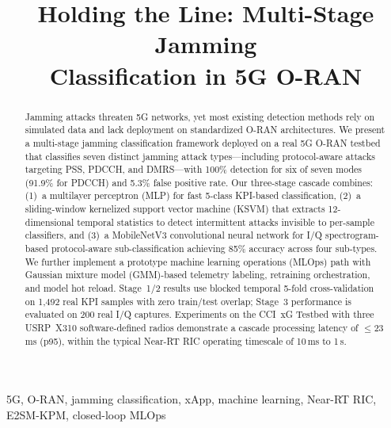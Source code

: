 \documentclass[conference]{IEEEtran}
\begin{document}
\title{Holding the Line: Multi-Stage Jamming\\Classification in 5G O-RAN}

\author{
}

\maketitle

\begin{abstract}
Jamming attacks threaten 5G networks, yet most existing detection methods rely on simulated data and lack deployment on standardized O-RAN architectures. We present a multi-stage jamming classification framework deployed on a real 5G O-RAN testbed that classifies seven distinct jamming attack types---including protocol-aware attacks targeting PSS, PDCCH, and DMRS---with 100\% detection for six of seven modes (91.9\% for PDCCH) and 5.3\% false positive rate. Our three-stage cascade combines: (1)~a multilayer perceptron (MLP) for fast 5-class KPI-based classification, (2)~a sliding-window kernelized support vector machine (KSVM) that extracts 12-dimensional temporal statistics to detect intermittent attacks invisible to per-sample classifiers, and (3)~a MobileNetV3 convolutional neural network for I/Q spectrogram-based protocol-aware sub-classification achieving 85\% accuracy across four sub-types. We further implement a prototype machine learning operations (MLOps) path with Gaussian mixture model (GMM)-based telemetry labeling, retraining orchestration, and model hot reload. Stage~1/2 results use blocked temporal 5-fold cross-validation on 1,492 real KPI samples with zero train/test overlap; Stage~3 performance is evaluated on 200 real I/Q captures. Experiments on the CCI~xG Testbed with three USRP~X310 software-defined radios demonstrate a cascade processing latency of $\leq$23\,ms (p95), within the typical Near-RT RIC operating timescale of 10\,ms to 1\,s.
\end{abstract}

\begin{IEEEkeywords}
5G, O-RAN, jamming classification, xApp, machine learning, Near-RT RIC, E2SM-KPM, closed-loop MLOps
\end{IEEEkeywords}
\end{document}
